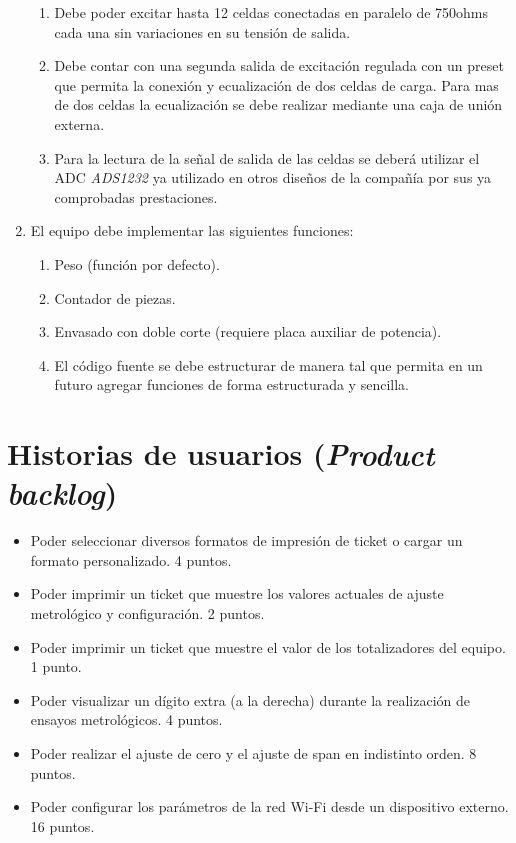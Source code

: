 \documentclass[11pt]{charter}
\begin{document}
\begin{enumerate}
\begin{enumerate}
	\item Debe poder excitar hasta 12 celdas conectadas en paralelo de 750ohms cada una sin variaciones en su tensión de salida. 
	\item Debe contar con una segunda salida de excitación regulada con un preset que permita la conexión y ecualización de dos celdas de carga. Para mas de dos celdas la ecualización se debe realizar mediante una caja de unión externa.
	\item Para la lectura de la señal de salida de las celdas se deberá utilizar el ADC \textit{ADS1232} ya utilizado en otros diseños de la compañía por sus ya comprobadas prestaciones.
	\end{enumerate}	
\item El equipo debe implementar las siguientes funciones:
	\begin{enumerate}
	\item Peso (función por defecto).
	\item Contador de piezas.
	\item Envasado con doble corte (requiere placa auxiliar de potencia).
	\item El código fuente se debe estructurar de manera tal que permita en un futuro agregar funciones de forma estructurada y sencilla.
	\end{enumerate}				
\end{enumerate}

\section{Historias de usuarios (\textit{Product backlog})}
\label{sec:backlog}
%
\begin{itemize}
\item Poder seleccionar diversos formatos de impresión de ticket o cargar un formato personalizado. 4 puntos.
\item Poder imprimir un ticket que muestre los valores actuales de ajuste metrológico y configuración. 2 puntos.
\item Poder imprimir un ticket que muestre el valor de los totalizadores del equipo. 1 punto.
\item Poder visualizar un dígito extra (a la derecha) durante la realización de ensayos metrológicos. 4 puntos.
\item Poder realizar el ajuste de cero y el ajuste de span en indistinto orden. 8 puntos.
\item Poder configurar los parámetros de la red Wi-Fi desde un dispositivo externo. 16 puntos.

\end{itemize}
\end{document}
